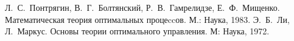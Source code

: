 \documentclass[a4paper, 11pt]{article}
\theoremstyle{definition}
\theoremstyle{plane}
\theoremstyle{remark}
\begin{document}
        

        \tableofcontents
        \clearpage
        
        
        
        
        

        \begin{thebibliography}{9}
                 Л.~С.~Понтрягин, В.~Г.~Болтянский, Р.~В.~Гамрелидзе, Е.~Ф.~Мищенко. Математическая теория оптимальных процеccов. М.: Наука, 1983.
                 Э.~Б.~Ли, Л.~Маркус. Основы теории оптимального управления. М: Наука, 1972.
        \end{thebibliography} 
\end{document}
